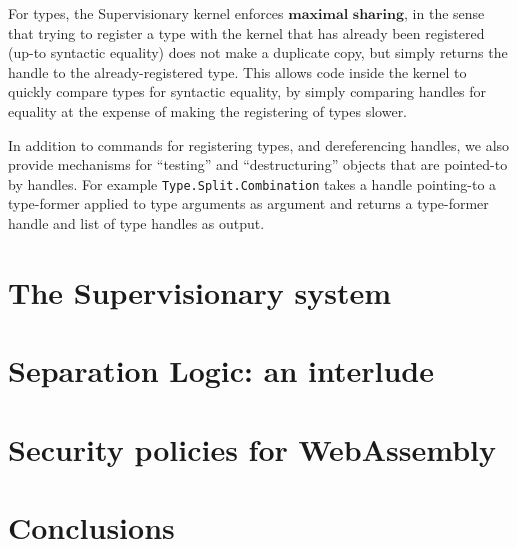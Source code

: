 \documentclass[a4paper, 10pt]{article}
\newcommand{\deffont}[1]{\ensuremath{\textbf{#1}}}
\begin{document}
For types, the Supervisionary kernel enforces \deffont{maximal sharing}, in the sense that trying to register a type with the kernel that has already been registered (up-to syntactic equality) does not make a duplicate copy, but simply returns the handle to the already-registered type.
This allows code inside the kernel to quickly compare types for syntactic equality, by simply comparing handles for equality at the expense of making the registering of types slower.

In addition to commands for registering types, and dereferencing handles, we also provide mechanisms for ``testing'' and ``destructuring'' objects that are pointed-to by handles.
For example \texttt{Type.Split.Combination} takes a handle pointing-to a type-former applied to type arguments as argument and returns a type-former handle and list of type handles as output.

\section{The Supervisionary system}
\label{sect.supervisionary.system}

\section{Separation Logic: an interlude}
\label{sect.separation.logic.an.interlude}

\section{Security policies for WebAssembly}
\label{sect.security.policies.for.webassembly}

\section{Conclusions}
\label{sect.conclusions}
\end{document}
